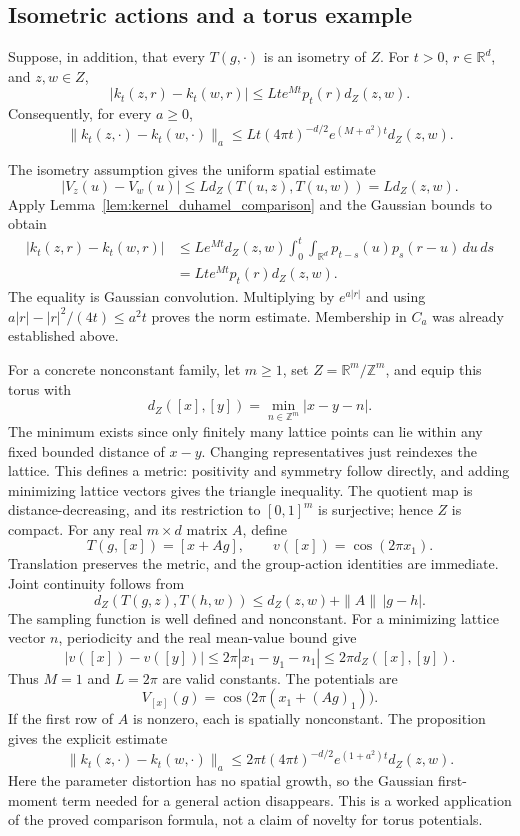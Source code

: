 \subsection{Isometric actions and a torus example}
\begin{proposition}
\label{prop:isometric_dynamic_kernel}
Suppose, in addition, that every $T(g,\cdot)$ is an isometry of $Z$.
For $t>0$, $r\in\mathbb R^d$, and $z,w\in Z$,
\[
|k_t(z,r)-k_t(w,r)|
\leq Lt e^{Mt}p_t(r)d_Z(z,w).
\]
Consequently, for every $a\geq0$,
\[
\|k_t(z,\cdot)-k_t(w,\cdot)\|_a
\leq Lt(4\pi t)^{-d/2}e^{(M+a^2)t}d_Z(z,w).
\]
\end{proposition}
\Proof
The isometry assumption gives the uniform spatial estimate
\[
|V_z(u)-V_w(u)|
\leq Ld_Z(T(u,z),T(u,w))=Ld_Z(z,w).
\]
Apply Lemma~\ref{lem:kernel_duhamel_comparison} and the Gaussian
bounds to obtain
\[
\begin{split}
|k_t(z,r)-k_t(w,r)|
&\leq Le^{Mt}d_Z(z,w)
  \int_0^t\int_{\mathbb R^d}p_{t-s}(u)p_s(r-u)\,du\,ds\\
&=Lt e^{Mt}p_t(r)d_Z(z,w).
\end{split}
\]
The equality is Gaussian convolution. Multiplying by $e^{a|r|}$
and using $a|r|-|r|^2/(4t)\leq a^2t$ proves the norm estimate.
Membership in $C_a$ was already established above.
\Done

For a concrete nonconstant family, let $m\geq1$, set
$Z=\mathbb R^m/\mathbb Z^m$, and equip this torus with
\[
d_Z([x],[y])=\min_{n\in\mathbb Z^m}|x-y-n|.
\]
The minimum exists since only finitely many lattice points can lie
within any fixed bounded distance of $x-y$. Changing representatives
just reindexes the lattice. This defines a metric: positivity and
symmetry follow directly, and adding minimizing lattice vectors gives
the triangle inequality. The quotient map is distance-decreasing, and
its restriction to $[0,1]^m$ is surjective; hence $Z$ is compact.
For any real $m\times d$ matrix $A$, define
\[
T(g,[x])=[x+Ag],\qquad v([x])=\cos(2\pi x_1).
\]
Translation preserves the metric, and the group-action identities are
immediate. Joint continuity follows from
\[
d_Z(T(g,z),T(h,w))\leq d_Z(z,w)+\|A\|\,|g-h|.
\]
The sampling function is well defined and nonconstant. For a minimizing
lattice vector $n$, periodicity and the real mean-value bound give
\[
|v([x])-v([y])|
\leq2\pi|x_1-y_1-n_1|
\leq2\pi d_Z([x],[y]).
\]
Thus $M=1$ and $L=2\pi$ are valid constants. The potentials are
\[
V_{[x]}(g)=\cos\bigl(2\pi(x_1+(Ag)_1)\bigr).
\]
If the first row of $A$ is nonzero, each is spatially nonconstant.
The proposition gives the explicit estimate
\[
\|k_t(z,\cdot)-k_t(w,\cdot)\|_a
\leq2\pi t(4\pi t)^{-d/2}e^{(1+a^2)t}d_Z(z,w).
\]
Here the parameter distortion has no spatial growth, so the Gaussian
first-moment term needed for a general action disappears. This is a
worked application of the proved comparison formula, not a claim of
novelty for torus potentials.

